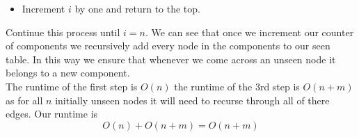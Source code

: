 \documentclass[11pt]{article}
\begin{document}
\begin{enumerate}
\begin{enumerate}
\begin{itemize}
{                                        difficult to describe.} to all
                                        nodes with an edge to  $v_i$ and apply
                                        this step on them. Then add  $v_i$ to
                                        \textit{seen}.
                                \item Increment $i$ by one and return to the
                                        top.
                        \end{itemize}
                                        Continue this process until $i = n$.
                                        We can see that once we increment our
                                        counter of components we recursively
                                        add
                                        every node in the components
                                        to our seen table. In this way we ensure that
                                        whenever we come across an unseen node
                                        it belongs to a new component.\\
                                        The runtime of the first step is $O(n)$
                                        the runtime of the $3$rd step is
                                        $O(n+m)$ as for all $n$ initially unseen nodes it
                                        will need to recurse through all of
                                        there edges. Our runtime is
                                        $$ O(n) + O(n+m) = O(n+m)$$	
			

\end{enumerate}
\end{enumerate}
\end{document}
